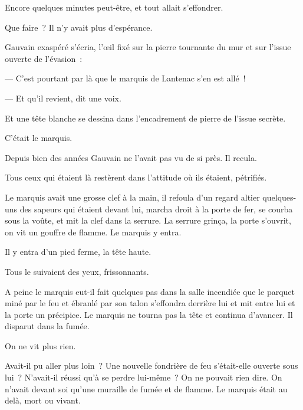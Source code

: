 \documentclass[french,twoside]{book} %
\begin{document}
Encore quelques minutes peut-être, et tout allait s’effondrer.\par
Que faire ? Il n’y avait plus d’espérance.\par
Gauvain exaspéré s’écria, l’œil fixé sur la pierre tournante du mur et sur l’issue ouverte de l’évasion :\par
— C’est pourtant par là que le marquis de Lantenac s’en est allé !\par
— Et qu’il revient, dit une voix.\par
Et une tête blanche se dessina dans l’encadrement de pierre de l’issue secrète.\par
C’était le marquis.\par
 Depuis bien des années Gauvain ne l’avait pas vu de si près. Il recula.\par
Tous ceux qui étaient là restèrent dans l’attitude où ils étaient, pétrifiés.\par
Le marquis avait une grosse clef à la main, il refoula d’un regard altier quelques-uns des sapeurs qui étaient devant lui, marcha droit à la porte de fer, se courba sous la voûte, et mit la clef dans la serrure. La serrure grinça, la porte s’ouvrit, on vit un gouffre de flamme. Le marquis y entra.\par
Il y entra d’un pied ferme, la tête haute.\par
Tous le suivaient des yeux, frissonnants.\par
A peine le marquis eut-il fait quelques pas dans la salle incendiée que le parquet miné par le feu et ébranlé par son talon s’effondra derrière lui et mit entre lui et la porte un précipice. Le marquis ne tourna pas la tête et continua d’avancer. Il disparut dans la fumée.\par
On ne vit plus rien.\par
Avait-il pu aller plus loin ? Une nouvelle fondrière de feu s’était-elle ouverte sous lui ? N’avait-il réussi qu’à se perdre lui-même ? On ne pouvait rien dire. On n’avait devant soi qu’une muraille de fumée et de flamme. Le marquis était au delà, mort ou vivant.
\end{document}
